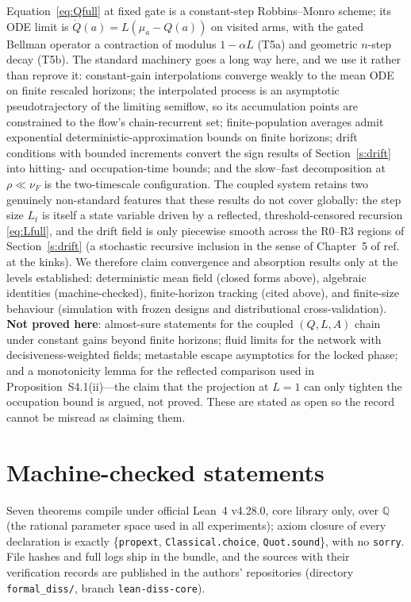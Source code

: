 \documentclass[11pt]{article}
\newcommand{\1}{\mathbf{1}}
\begin{document}
Equation~\eqref{eq:Qfull} at fixed gate is a constant-step Robbins--Monro scheme; its ODE limit is $\dot Q(a)=L(\mu_a-Q(a))$ on visited arms, with the gated Bellman operator a contraction of modulus $1-\alpha L$ (T5a) and geometric $n$-step decay (T5b). The standard machinery goes a long way here, and we use it rather than reprove it: constant-gain interpolations converge weakly to the mean ODE on finite rescaled horizons\cite{KushnerYin2003,Borkar2008}; the interpolated process is an asymptotic pseudotrajectory of the limiting semiflow, so its accumulation points are constrained to the flow's chain-recurrent set\cite{Benaim1999}; finite-population averages admit exponential deterministic-approximation bounds on finite horizons\cite{BenaimWeibull2003}; drift conditions with bounded increments convert the sign results of Section~\ref{s:drift} into hitting- and occupation-time bounds\cite{Hajek1982}; and the slow--fast decomposition at $\rho\ll\nu_F$ is the two-timescale configuration\cite{Borkar2008}. The coupled system retains two genuinely non-standard features that these results do not cover globally: the step size $L_t$ is itself a state variable driven by a reflected, threshold-censored recursion \eqref{eq:Lfull}, and the drift field is only piecewise smooth across the R0--R3 regions of Section~\ref{s:drift} (a stochastic recursive inclusion in the sense of Chapter~5 of ref.~ at the kinks). We therefore claim convergence and absorption results only at the levels established: deterministic mean field (closed forms above), algebraic identities (machine-checked), finite-horizon tracking (cited above), and finite-size behaviour (simulation with frozen designs and distributional cross-validation). \textbf{Not proved here}: almost-sure statements for the coupled $(Q,L,A)$ chain under constant gains beyond finite horizons; fluid limits for the network with decisiveness-weighted fields; metastable escape asymptotics for the locked phase; and a monotonicity lemma for the reflected comparison used in Proposition~S4.1(ii)---the claim that the projection at $L=1$ can only tighten the occupation bound is argued, not proved. These are stated as open so the record cannot be misread as claiming them.

\section{Machine-checked statements}
\label{s:lean}

Seven theorems compile under official Lean~4 v4.28.0, core library only, over $\mathbb Q$ (the rational parameter space used in all experiments); axiom closure of every declaration is exactly \{\texttt{propext}, \texttt{Classical.choice}, \texttt{Quot.sound}\}, with no \texttt{sorry}. File hashes and full logs ship in the bundle, and the sources with their verification records are published in the authors' repositories (directory \texttt{formal\_diss/}, branch \texttt{lean-diss-core}).
\end{document}
